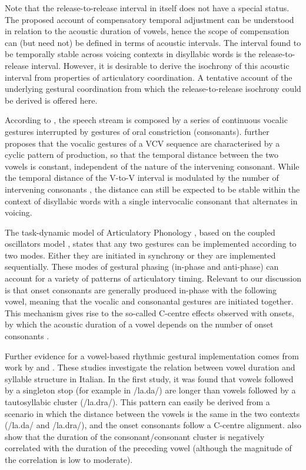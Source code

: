 \documentclass[
  12pt,
  a4paper,
]{article}
\begin{document}
Note that the release-to-release interval in itself does not have a
special status. The proposed account of compensatory temporal adjustment
can be understood in relation to the acoustic duration of vowels, hence
the scope of compensation can (but need not) be defined in terms of
acoustic intervals. The interval found to be temporally stable across
voicing contexts in disyllabic words is the release-to-release interval.
However, it is desirable to derive the isochrony of this acoustic
interval from properties of articulatory coordination. A tentative
account of the underlying gestural coordination from which the
release-to-release isochrony could be derived is offered here.

According to \citet{ohman1966, ohman1967}, the speech stream is composed
by a series of continuous vocalic gestures interrupted by gestures of
oral constriction (consonants). \citet{fowler1983} further proposes that
the vocalic gestures of a VCV sequence are characterised by a cyclic
pattern of production, so that the temporal distance between the two
vowels is constant, independent of the nature of the intervening
consonant. While the temporal distance of the V-to-V interval is
modulated by the number of intervening consonants
\citep{zmarich2011, zeroual2015}, the distance can still be expected to
be stable within the context of disyllabic words with a single
intervocalic consonant that alternates in voicing.

The task-dynamic model \citep{saltzman2008} of Articulatory Phonology
\citep{ohala1986a, browman1988, browman1992}, based on the coupled
oscillators model \citep{odell2008}, states that any two gestures can be
implemented according to two modes. Either they are initiated in
synchrony or they are implemented sequentially. These modes of gestural
phasing (in-phase and anti-phase) can account for a variety of patterns
of articulatory timing. Relevant to our discussion is that onset
consonants are generally produced in-phase with the following vowel,
meaning that the vocalic and consonantal gestures are initiated
together. This mechanism gives rise to the so-called C-centre effects
observed with onsets, by which the acoustic duration of a vowel depends
on the number of onset consonants
\citep{browman1988, marin2010, hermes2013, marin2014}.

Further evidence for a vowel-based rhythmic gestural implementation
comes from work by \citet{farnetani1986} and \citet{celata2014}. These
studies investigate the relation between vowel duration and syllable
structure in Italian. In the first study, it was found that vowels
followed by a singleton stop (for example in /la.da/) are longer than
vowels followed by a tautosyllabic cluster (/la.dra/). This pattern can
easily be derived from a scenario in which the distance between the
vowels is the same in the two contexts (/la.da/ and /la.dra/), and the
onset consonants follow a C-centre alignment. \citet{celata2014} also
show that the duration of the consonant/consonant cluster is negatively
correlated with the duration of the preceding vowel (although the
magnitude of the correlation is low to moderate).
\end{document}
